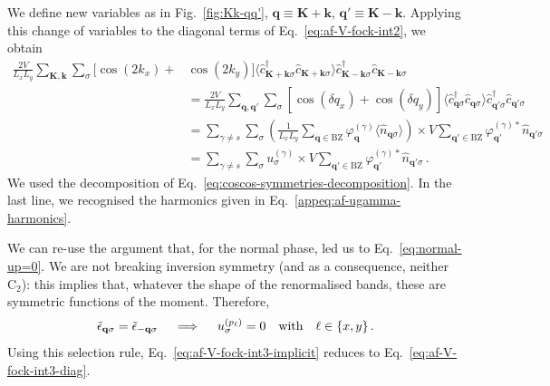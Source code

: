 \begin{tabproof}
	
	We define new variables as in Fig.~\ref{fig:Kk-qq'}, $\mathbf{q}\equiv\mathbf{K}+\mathbf{k}$, $\mathbf{q}'\equiv\mathbf{K}-\mathbf{k}$.
	Applying this change of variables to the diagonal terms of Eq.~\eqref{eq:af-V-fock-int2}, we obtain
	\begin{align}
		\frac{2V}{L_x L_y} \sum_{\mathbf{K}, \mathbf{k}} \sum_\sigma [
		\cos \left(
		2k_x
		\right)	+ &\cos \left(
		2k_y
		\right)	
		] \langle
		\hat c_{\mathbf{K}+\mathbf{k} \sigma}^\dagger 
		\hat c_{\mathbf{K}+\mathbf{k} \sigma}
		\rangle
		\hat c_{\mathbf{K}-\mathbf{k} \sigma}^\dagger \hat c_{\mathbf{K}-\mathbf{k}\sigma} \nonumber \\
		&= \frac{2V}{L_x L_y} \sum_{\mathbf{q}, \mathbf{q}'} \sum_\sigma \left[
		\cos \left( \delta q_x \right) + \cos \left( \delta q_y \right)
		\right] \langle
		\hat c_{\mathbf{q}\sigma}^\dagger \hat c_{\mathbf{q}\sigma} 
		\rangle
		\hat c_{\mathbf{q}'\sigma}^\dagger \hat c_{\mathbf{q}'\sigma}
		\nonumber \\
		&= \sum_{\gamma \neq s} \sum_\sigma \left(
		\frac{1}{L_x L_y} \sum_{\mathbf{q}\in\mathrm{BZ}} \varphi_\mathbf{q}^{(\gamma)}
		\langle
		\hat n_{\mathbf{q}\sigma}
		\rangle
		\right) \times V
		\sum_{\mathbf{q}'\in\mathrm{BZ}}
		\varphi_{\mathbf{q}'}^{(\gamma)*}
		\hat n_{\mathbf{q}'\sigma} \nonumber \\ 
		&= \sum_{\gamma \neq s} \sum_\sigma u_\sigma^{(\gamma)} \times V
		\sum_{\mathbf{q}'\in\mathrm{BZ}}
		\varphi_{\mathbf{q}'}^{(\gamma)*}
		\hat n_{\mathbf{q}'\sigma} \, .
		\label{eq:af-V-fock-int3-implicit}
	\end{align}
	We used the decomposition of Eq.~\eqref{eq:coscos-symmetries-decomposition}. In the last line, we recognised the harmonics given in Eq.~\eqref{appeq:af-ugamma-harmonics}.
	
	We can re-use the argument that, for the normal phase, led us to Eq.~\eqref{eq:normal-up=0}. We are not breaking inversion symmetry (and as a consequence, neither $\mathrm{C}_2$): this implies that, whatever the shape of the renormalised bands, these are symmetric functions of the moment. Therefore,
	\[
	\tilde{\epsilon}_{\mathbf{q}\sigma} = \tilde{\epsilon}_{-\mathbf{q}\sigma}
	\quad\implies\quad
	u^{(p_\ell)}_\sigma = 0
	\qq{with}
	\ell\in\lbrace x,y \rbrace \, .
	\]
	Using this selection rule, Eq.~\eqref{eq:af-V-fock-int3-implicit} reduces to Eq.~\eqref{eq:af-V-fock-int3-diag}.
\end{tabproof}


